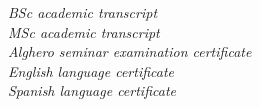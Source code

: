 \documentclass[a4paper,12pt]{article} %
\begin{document}



\Sep %


\textit{BSc academic transcript}\\
\textit{MSc academic transcript}\\
\textit{Alghero seminar examination certificate}\\
\textit{English language certificate}\\
\textit{Spanish language certificate}\\
\end{document}
